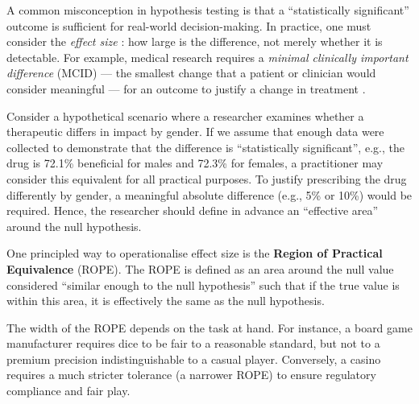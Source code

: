 A common misconception in hypothesis testing is that a ``statistically significant'' outcome is sufficient for real-world decision-making. In practice, one must consider the \textit{effect size} \citep{cohen1988}: how large is the difference, not merely whether it is detectable. For example, medical research requires a \textit{minimal clinically important difference} (MCID) --- the smallest change that a patient or clinician would consider meaningful --- for an outcome to justify a change in treatment \citep{jaeschke1989}.
%

Consider a hypothetical scenario where a researcher examines whether a therapeutic differs in impact by gender.
If we assume that enough data were collected to demonstrate that the difference is ``statistically significant'', e.g., the drug is 72.1\% beneficial for males and 72.3\% for females, a practitioner may consider this equivalent for all practical purposes. To justify prescribing the drug differently by gender, a meaningful absolute difference (e.g., 5\% or 10\%) would be required. Hence, the researcher should define in advance an ``effective area'' around the null hypothesis.

One principled way to operationalise effect size is the \textbf{Region of Practical Equivalence} (ROPE).
The ROPE is defined as an area around the null value considered ``similar enough to the null hypothesis''
such that if the true value is within this area, it is effectively the same as the null hypothesis.

The width of the ROPE depends on the task at hand. For instance, a board game manufacturer requires dice to be fair to a reasonable standard, but not to a premium precision indistinguishable to a casual player. Conversely, a casino requires a much stricter tolerance (a narrower ROPE) to ensure regulatory compliance and fair play.


